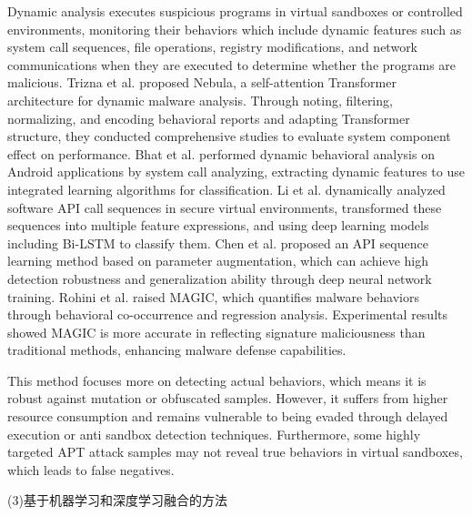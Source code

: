 Dynamic analysis executes suspicious programs in virtual sandboxes or controlled environments, monitoring their behaviors which include dynamic features such as system call sequences, file operations, registry modifications, and network communications when they are executed to determine whether the programs are malicious. Trizna et al. proposed Nebula, a self-attention Transformer architecture for dynamic malware analysis\cite{trizna2024nebula}. Through noting, filtering, normalizing, and encoding behavioral reports and adapting Transformer structure, they conducted comprehensive studies to evaluate system component effect on performance. Bhat et al. performed dynamic behavioral analysis on Android applications by system call analyzing, extracting dynamic features to use integrated learning algorithms for classification\cite{bhat2023system}. Li et al. dynamically analyzed software API call sequences in secure virtual environments, transformed these sequences into multiple feature expressions, and using deep learning models including Bi-LSTM to classify them\cite{li2022novel}. Chen et al. proposed an API sequence learning method based on parameter augmentation, which can achieve high detection robustness and generalization ability through deep neural network training\cite{chen2022cruparamer}. Rohini et al. raised MAGIC, which quantifies malware behaviors through behavioral co-occurrence and regression analysis\cite{rohini2024magic}. Experimental results showed MAGIC is more accurate in reflecting signature maliciousness than traditional methods, enhancing malware defense capabilities.

This method focuses more on detecting actual behaviors, which means it is robust against mutation or obfuscated samples. However, it suffers from higher resource consumption and remains vulnerable to being evaded through delayed execution or anti sandbox detection techniques. Furthermore, some highly targeted APT attack samples may not reveal true behaviors in virtual sandboxes, which leads to false negatives.

(3)基于机器学习和深度学习融合的方法

